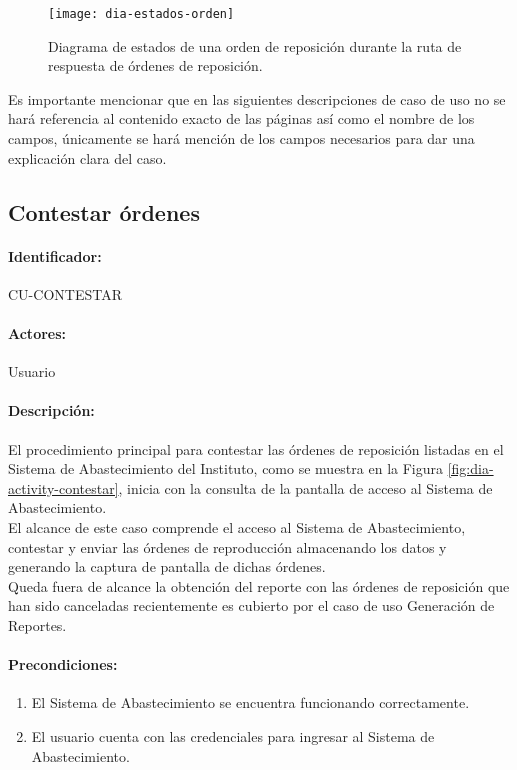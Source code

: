 \begin{figure}[h]
  \centering
  \texttt{[image: dia-estados-orden]} 
  \caption{Diagrama de estados de una orden de reposición durante la ruta de respuesta de órdenes de reposición.}
  \label{fig:dia-estados-orden}
\end{figure}

Es importante mencionar que en las siguientes descripciones de caso de uso no se hará referencia al contenido exacto de las páginas así como el nombre de los campos, únicamente se hará mención de los campos necesarios para dar una explicación clara del caso.

\subsection{Contestar órdenes}\label{cu-contestar}
\paragraph{Identificador:}
CU-CONTESTAR
\paragraph{Actores:}
Usuario
\paragraph{Descripción:}
El procedimiento principal para contestar las órdenes de reposición listadas en el Sistema de Abastecimiento del Instituto, como se muestra en la Figura \ref{fig:dia-activity-contestar}, inicia con la consulta de la pantalla de acceso al Sistema de Abastecimiento.\\
El alcance de este caso comprende el acceso al Sistema de Abastecimiento, contestar y enviar las órdenes de reproducción almacenando los datos y generando la captura de pantalla de dichas órdenes.\\
Queda fuera de alcance la obtención del reporte con las órdenes de reposición que han sido canceladas recientemente es cubierto por el caso de uso Generación de Reportes.
\paragraph{Precondiciones:}
\begin{enumerate}
  \item El Sistema de Abastecimiento se encuentra funcionando correctamente.
  \item El usuario cuenta con las credenciales para ingresar al Sistema de Abastecimiento.
\end{enumerate}
